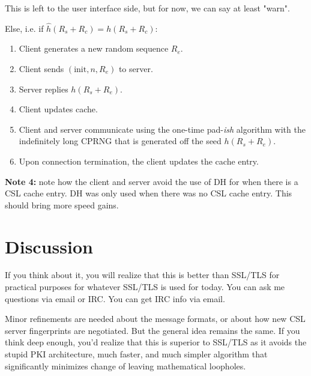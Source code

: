 \documentclass{article}
\begin{document}
\begin{enumerate}
\begin{enumerate}
\begin{enumerate}
                This is left to the user interface side, but for now, we can
                say at least "warn".
            \end{enumerate}
        Else, i.e. if $\hat h(R_s + R_c) = h(R_s + R_c)$:
            \begin{enumerate}
                \item Client generates a new random sequence $R_e$.
                \item Client sends $(\text{init}, n, R_e)$ to server.
                \item Server replies $h(R_s + R_e)$.
                \item Client updates cache.
                \item Client and server communicate using the one-time
                pad-\emph{ish} algorithm with the indefinitely long CPRNG that
                is generated off the seed $h(R_s+R_e)$.
                \item Upon connection termination, the client updates the cache
                entry.
            \end{enumerate}
        \textbf{Note 4:} note how the client and server avoid the use of DH for
        when there is a CSL cache entry. DH was only used when there was no CSL
        cache entry. This should bring more speed gains.

    \end{enumerate}
\end{enumerate}

\section{Discussion}
If you think about it, you will realize that this is better than SSL/TLS for
practical purposes for whatever SSL/TLS is used for today. You can ask me
questions via email or IRC. You can get IRC info via email.

Minor refinements are needed about the message formats, or
about how new CSL server fingerprints are negotiated. But the general idea
remains the same. If you think deep enough, you'd realize that this is superior
to SSL/TLS as it avoids the stupid PKI architecture, much faster, and much
simpler algorithm that significantly minimizes change of leaving mathematical
loopholes.
\end{document}

